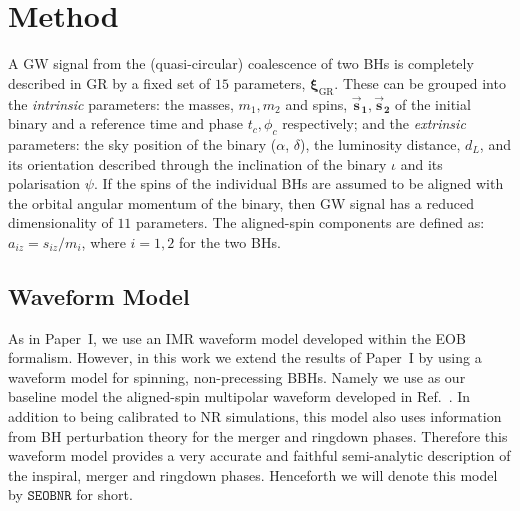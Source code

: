 \documentclass[twocolumn,prd,superscriptaddress,amsfonts,amssymb,amsmath,preprintnumbers]{revtex4-1}
\newcommand{\paperone}{Paper~I\xspace}
\newcommand{\bxigr}{\bm{\xi}_{\text{GR}}}
\newcommand{\bs}[1]{\bm{\vec{s}_{#1}}}
\newcommand{\SEOB}{\texttt{SEOBNR}}
\begin{document}
\section{Method}

A GW signal from the (quasi-circular) coalescence of two BHs is completely described in GR by a fixed set of $15$ parameters, $\bxigr$. These can be grouped into the \emph{intrinsic} parameters: the masses, $m_1, m_2$ and spins, $\bs1, \bs2$ of the initial binary and a reference time and phase $t_c, \phi_c$ respectively; and the \emph{extrinsic} parameters: the sky position of the binary ($\alpha$, $\delta$), the luminosity distance, $d_L$, and its orientation described through the inclination of the binary $\iota$ and its polarisation $\psi$. If the spins of the individual BHs are assumed to be aligned with the orbital angular momentum of the binary, then GW signal has a reduced dimensionality of $11$ parameters. The aligned-spin components are defined as: $a_{iz} = s_{iz}/m_i$, where $i=1,2$ for the two BHs.

\subsection{Waveform Model}\label{sec:model}

As in \paperone, we use an IMR waveform model developed within the EOB formalism. However, in this work we extend the results of \paperone by using a waveform model for spinning, non-precessing BBHs. Namely we use as our baseline model the aligned-spin multipolar waveform developed in Ref.~\citep{Cotesta:2018fcv}. In addition to being calibrated to NR simulations, this model also uses information from BH perturbation theory for the merger and ringdown phases. Therefore this waveform model provides a very accurate and faithful semi-analytic description of the inspiral, merger and ringdown phases. Henceforth we will denote this model by $\SEOB$ for short.
\end{document}
